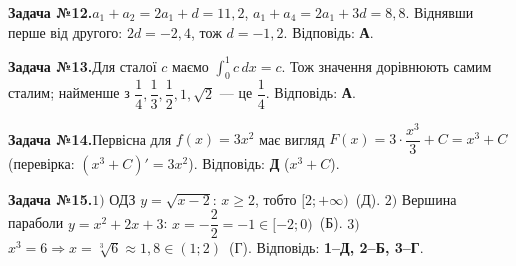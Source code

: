 \documentclass[12pt]{article}
\begin{document}
\par\vspace{0.3cm}\noindent\hypertarget{sol:12}{}
\begin{tcolorbox}[colback=titleBg!40, colframe=mainGreen!55, boxrule=0.4pt, arc=2pt, left=6pt, right=6pt, top=4pt, bottom=4pt, breakable]
\noindent\small\textbf{Задача №12.}\quad $a_1+a_2=2a_1+d=11{,}2$, $a_1+a_4=2a_1+3d=8{,}8$. Віднявши перше від другого: $2d=-2{,}4$, тож $d=-1{,}2$. Відповідь: \textbf{А}.
\par\vspace{0.1cm}\hfill\hyperlink{task:12}{}
\end{tcolorbox}
\par\vspace{0.3cm}\noindent\hypertarget{sol:13}{}
\begin{tcolorbox}[colback=titleBg!40, colframe=mainGreen!55, boxrule=0.4pt, arc=2pt, left=6pt, right=6pt, top=4pt, bottom=4pt, breakable]
\noindent\small\textbf{Задача №13.}\quad Для сталої $c$ маємо $\int_0^1 c\,dx=c$. Тож значення дорівнюють самим сталим; найменше з $\dfrac14,\dfrac13,\dfrac12,1,\sqrt2$ — це $\dfrac14$. Відповідь: \textbf{А}.
\par\vspace{0.1cm}\hfill\hyperlink{task:13}{}
\end{tcolorbox}
\par\vspace{0.3cm}\noindent\hypertarget{sol:14}{}
\begin{tcolorbox}[colback=titleBg!40, colframe=mainGreen!55, boxrule=0.4pt, arc=2pt, left=6pt, right=6pt, top=4pt, bottom=4pt, breakable]
\noindent\small\textbf{Задача №14.}\quad Первісна для $f(x) = 3x^2$ має вигляд $F(x) = 3\cdot\dfrac{x^3}{3} + C = x^3 + C$ (перевірка: $(x^3+C)' = 3x^2$). Відповідь: \textbf{Д} ($x^3 + C$).
\par\vspace{0.1cm}\hfill\hyperlink{task:14}{}
\end{tcolorbox}
\par\vspace{0.3cm}\noindent\hypertarget{sol:15}{}
\begin{tcolorbox}[colback=titleBg!40, colframe=mainGreen!55, boxrule=0.4pt, arc=2pt, left=6pt, right=6pt, top=4pt, bottom=4pt, breakable]
\noindent\small\textbf{Задача №15.}\quad $1)$ ОДЗ $y=\sqrt{x-2}$: $x\ge 2$, тобто $[2;+\infty)$~(Д). $2)$ Вершина параболи $y=x^2+2x+3$: $x=-\dfrac{2}{2}=-1\in[-2;0)$~(Б). $3)$ $x^3=6 \Rightarrow x=\sqrt[3]{6}\approx 1{,}8\in(1;2)$~(Г). Відповідь: \textbf{1--Д, 2--Б, 3--Г}.
\par\vspace{0.1cm}\hfill\hyperlink{task:15}{}
\end{tcolorbox}
\end{document}
